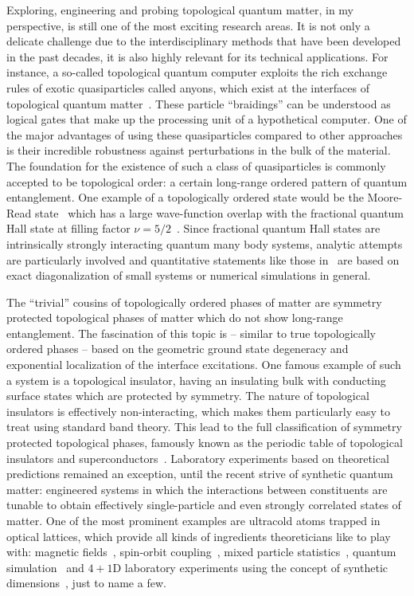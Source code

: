 Exploring, engineering and probing topological quantum matter, in my perspective, is still one of the most exciting research areas.
It is not only a delicate challenge due to the interdisciplinary methods that have been developed in the past decades, it is also highly relevant for its technical applications.
For instance, a so-called topological quantum computer exploits the rich exchange rules of exotic quasiparticles called anyons, which exist at the interfaces of topological quantum matter~\cite{Freedman2002}.
These particle ``braidings'' can be understood as logical gates that make up the processing unit of a hypothetical computer.
One of the major advantages of using these quasiparticles compared to other approaches is their incredible robustness against perturbations in the bulk of the material.
The foundation for the existence of such a class of quasiparticles is commonly accepted to be topological order: a certain long-range ordered pattern of quantum entanglement.
One example of a topologically ordered state would be the Moore-Read state~\cite{Moore1991,Read1996} which has a large wave-function overlap with the fractional quantum Hall state at filling factor $\nu=5/2$~\cite{Storni2010}.
Since fractional quantum Hall states are intrinsically strongly interacting quantum many body systems, analytic attempts are particularly involved and quantitative statements like those in~\cite{Storni2010} are based on exact diagonalization of small systems or numerical simulations in general.

The ``trivial'' cousins of topologically ordered phases of matter are symmetry protected topological phases of matter which do not show long-range entanglement.
The fascination of this topic is -- similar to true topologically ordered phases -- based on the geometric ground state degeneracy and exponential localization of the interface excitations.
One famous example of such a system is a topological insulator, having an insulating bulk with conducting surface states which are protected by symmetry.
The nature of topological insulators is effectively non-interacting, which makes them particularly easy to treat using standard band theory.
This lead to the full classification of symmetry protected topological phases, famously known as the periodic table of topological insulators and superconductors~\cite{Altland1997,Kitaev2009}.
Laboratory experiments based on theoretical predictions remained an exception, until the recent strive of synthetic quantum matter:
engineered systems in which the interactions between constituents are tunable to obtain effectively single-particle and even strongly correlated states of matter.
One of the most prominent examples are ultracold atoms trapped in optical lattices, which provide all kinds of ingredients theoreticians like to play with: magnetic fields~\cite{Lin2009}, spin-orbit coupling~\cite{Lin2011}, mixed particle statistics~\cite{Ferrari2002}, quantum simulation~\cite{Mazza2012} and $4+1$D laboratory experiments using the concept of synthetic dimensions~\cite{Lohse2018}, just to name a few.
%
%
